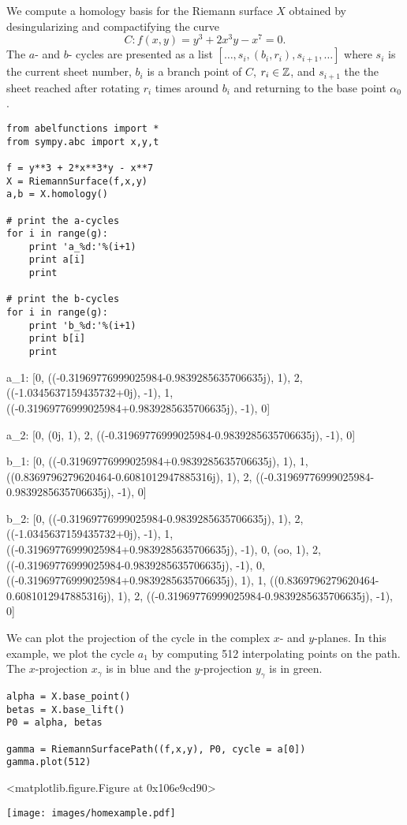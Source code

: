 We compute a homology basis for the Riemann surface $X$ obtained by
desingularizing and compactifying the curve
\[
    C : f(x,y) = y^3 + 2x^3y - x^7 = 0.
\]
The $a$- and $b$- cycles are presented as a list $[\ldots,
  s_i,(b_i,r_i), s_{i+1}, \ldots]$ where $s_i$ is the current sheet
number, $b_i$ is a branch point of $C$, $r_i \in \operatorname{\mathbb{Z}}$, and $s_{i+1}$ the
the sheet reached after rotating $r_i$ times around $b_i$ and returning
to the base point $\alpha_0$.
\begin{lstlisting}
from abelfunctions import *
from sympy.abc import x,y,t

f = y**3 + 2*x**3*y - x**7
X = RiemannSurface(f,x,y)
a,b = X.homology()

# print the a-cycles
for i in range(g):
    print 'a_%d:'%(i+1)
    print a[i]
    print

# print the b-cycles
for i in range(g):
    print 'b_%d:'%(i+1)
    print b[i]
    print
\end{lstlisting}
\begin{pyoutput}
a_1:
[0, ((-0.31969776999025984-0.9839285635706635j), 1), 2,
 ((-1.0345637159435732+0j), -1), 1,
 ((-0.31969776999025984+0.9839285635706635j), -1), 0]

a_2:
[0, (0j, 1), 2, ((-0.31969776999025984-0.9839285635706635j), -1), 0]

b_1:
[0, ((-0.31969776999025984+0.9839285635706635j), 1), 1,
 ((0.8369796279620464-0.6081012947885316j), 1), 2,
 ((-0.31969776999025984-0.9839285635706635j), -1), 0]


b_2:
[0, ((-0.31969776999025984-0.9839285635706635j), 1), 2,
 ((-1.0345637159435732+0j), -1), 1,
 ((-0.31969776999025984+0.9839285635706635j), -1), 0, (oo, 1), 2,
 ((-0.31969776999025984-0.9839285635706635j), -1), 0,
 ((-0.31969776999025984+0.9839285635706635j), 1), 1,
 ((0.8369796279620464-0.6081012947885316j), 1), 2,
 ((-0.31969776999025984-0.9839285635706635j), -1), 0]
\end{pyoutput}
We can plot the projection of the cycle in the complex $x$- and
$y$-planes. In this example, we plot the cycle $a_1$ by computing 512
interpolating points on the path. The $x$-projection $x_\gamma$ is in
blue and the $y$-projection $y_\gamma$ is in green.
\begin{lstlisting}
alpha = X.base_point()
betas = X.base_lift()
P0 = alpha, betas

gamma = RiemannSurfacePath((f,x,y), P0, cycle = a[0])
gamma.plot(512)
\end{lstlisting}
\begin{pyoutput}
<matplotlib.figure.Figure at 0x106e9cd90>
\end{pyoutput}
\begin{center}
\texttt{[image: images/homexample.pdf]}
\end{center}

